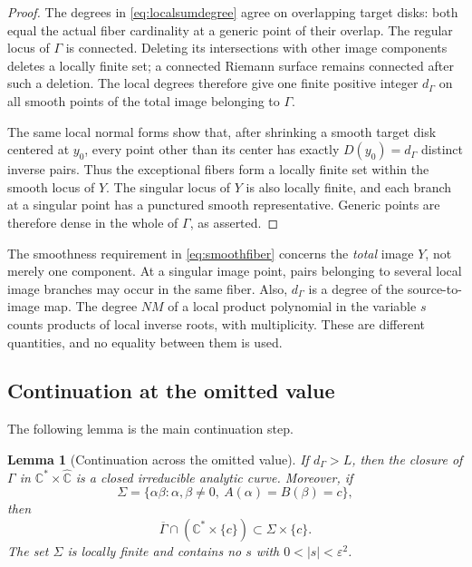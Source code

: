 \documentclass[11pt,reqno]{amsart}
\newtheorem{lemma}[theorem]{Lemma}
\theoremstyle{remark}
\numberwithin{equation}{section}
\newcommand{\C}{\mathbb C}
\newcommand{\Cs}{\C^*}
\newcommand{\Ps}{\widehat{\C}}
\begin{document}
\begin{proof}
The degrees in \eqref{eq:localsumdegree} agree on overlapping
target disks: both equal the actual fiber cardinality at a generic
point of their overlap. The regular locus of $\Gamma$ is
connected. Deleting its intersections with other image components
deletes a locally finite set; a connected Riemann surface remains
connected after such a deletion. The local degrees therefore give
one finite positive integer $d_\Gamma$ on all smooth points of the
total image belonging to $\Gamma$.

The same local normal forms show that, after shrinking a smooth
target disk centered at $y_0$, every point other than its center
has exactly $D(y_0)=d_\Gamma$ distinct inverse pairs. Thus the
exceptional fibers form a locally finite set within the smooth
locus of $Y$. The singular locus of $Y$ is also locally finite,
and each branch at a singular point has a punctured smooth
representative. Generic points are therefore dense in the whole
of $\Gamma$, as asserted.
\end{proof}

The smoothness requirement in \eqref{eq:smoothfiber} concerns the
\emph{total} image $Y$, not merely one component. At a singular image
point, pairs belonging to several local image branches may occur in
the same fiber.
Also, $d_\Gamma$ is a degree of the source-to-image map. The degree
$NM$ of a local product polynomial in the variable $s$ counts
products of local inverse roots, with multiplicity. These are
different quantities, and no equality between them is used.

\subsection{Continuation at the omitted value}
The following lemma is the main continuation step.

\begin{lemma}[Continuation across the omitted value]\label{lem:closure}
If $d_\Gamma>L$, then the closure of $\Gamma$ in
$\Cs\times\Ps$ is a closed irreducible analytic curve. Moreover, if
\[
 \Sigma=\{\alpha\beta:\alpha,\beta\ne0,
                    \ A(\alpha)=B(\beta)=c\},
\]
then
\begin{equation}\label{eq:boundary}
 \overline\Gamma\cap(\Cs\times\{c\})
 \subset\Sigma\times\{c\}.
\end{equation}
The set $\Sigma$ is locally finite and contains no $s$ with
$0<|s|<\varepsilon^2$.
\end{lemma}
\end{document}
